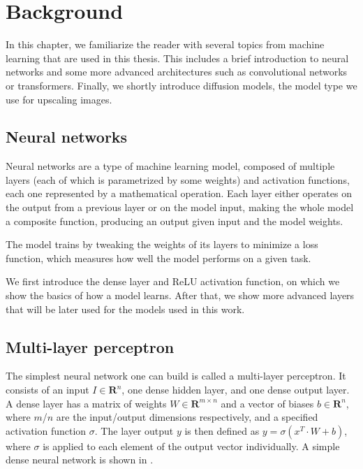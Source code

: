 \chapter{Background} \label{background}


In this chapter, we familiarize the reader with several topics from machine learning that are used in this thesis. This includes a brief introduction to neural networks and some more advanced architectures such as convolutional networks or transformers. Finally, we shortly introduce diffusion models, the model type we use for upscaling images.

\section{Neural networks}

Neural networks are a type of machine learning model, composed of multiple layers (each of which is parametrized by some weights) and activation functions, each one represented by a mathematical operation. Each layer either operates on the output from a previous layer or on the model input, making the whole model a composite function, producing an output given input and the model weights.

The model trains by tweaking the weights of its layers to minimize a loss function, which measures how well the model performs on a given task. 

We first introduce the dense layer and ReLU activation function, on which we show the basics of how a model learns. After that, we show more advanced layers that will be later used for the models used in this work. 

\section{Multi-layer perceptron}

The simplest neural network one can build is called a multi-layer perceptron. It consists of an input $I \in \mathbf{R}^{n}$, one dense hidden layer, and one dense output layer. A dense layer has a matrix of weights $W \in \mathbf{R}^{m \times n}$ and a vector of biases $b \in \mathbf{R}^n$, where $m$/$n$ are the input/output dimensions respectively, and a specified activation function $\sigma$. The layer output $y$ is then defined as $y = \sigma(x^T \cdot W + b)$, where $\sigma$ is applied to each element of the output vector individually. A simple dense neural network is shown in .

